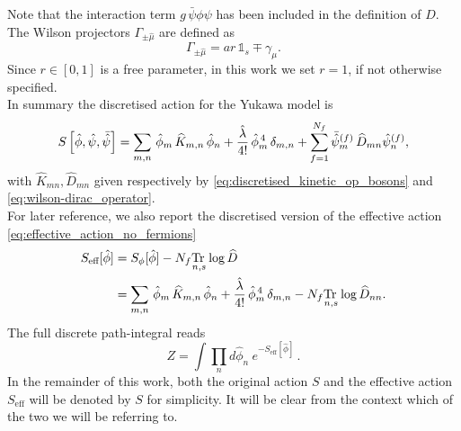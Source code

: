 Note that the interaction term $g\, \bar\psi\phi\psi$ has been included in the definition of $D$. \\
The Wilson projectors $\Gamma_{\pm \hat \mu}$ are defined as
\begin{equation*}
    \Gamma_{\pm \hat \mu} = ar \, \mathds{1}_s \mp \gamma_\mu.
\end{equation*}
Since $r \in [0,1]$ is a free parameter, in this work we set $r=1$, if not otherwise specified. \\
In summary the discretised action for the Yukawa model is 
\begin{equation}
    S\left[\hat{\phi}, \hat{\psi}, \bar{\hat{\psi}} \right] = \sum_{m,n} \, \hat{\phi}_m \, \widehat{K}_{m,n} \, \hat{\phi}_n + \frac{\hat{\lambda}}{4!} \, \hat{\phi}_m^{\,4} \, \delta_{m,n} + \sum_{f=1}^{N_f}\bar{\hat{\psi}}_m^{(f)} \, \widehat{D}_{mn} \hat{\psi}_n^{(f)},
    \label{eq:discretised_action}
\end{equation}
with $\widehat{K}_{mn}, \widehat{D}_{mn}$ given respectively by \eqref{eq:discretised_kinetic_op_bosons} and \eqref{eq:wilson-dirac_operator}. \\
For later reference, we also report the discretised version of the effective action \eqref{eq:effective_action_no_fermions}
\begin{equation}
	\begin{aligned}
		S_\text{eff}[\hat\phi] 	&= S_\phi[\hat\phi] - N_f \underset{n,s}{\operatorname{\text{Tr} \,}} \log \widehat{D} \\
							&= \sum_{m,n} \, \hat{\phi}_m \, \widehat{K}_{m,n} \, \hat{\phi}_n + \frac{\hat{\lambda}}{4!} \, \hat{\phi}_m^{\,4} \, \delta_{m,n} - N_f \underset{n,s}{\operatorname{\text{Tr} \,}} \log \widehat{D}_{nn}.
	\end{aligned}
	\label{eq:discretised_effective_action}
\end{equation}
The full discrete path-integral reads
\begin{equation}
    Z = \int \prod_n d\hat\phi_n \ e^{-S_\text{eff}[\hat\phi]} \, .
    \label{eq:discretised_path_integral}
\end{equation}
In the remainder of this work, both the original action $S$ and the effective action $S_\text{eff}$ will be denoted by $S$ for simplicity. It will be clear from the context which of the two we will be referring to.

